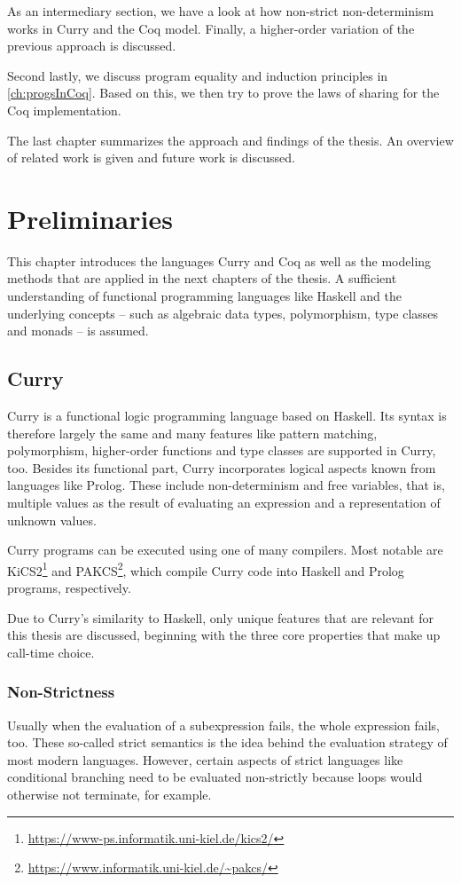 \documentclass[a4paper, 11pt, fleqn, twoside, abstract=on]{scrreprt}
\begin{document}
As an intermediary section, we have a look at how non-strict non-determinism works in Curry and the Coq model.
Finally, a higher-order variation of the previous approach is discussed.

Second lastly, we discuss program equality and induction principles in  \autoref{ch:progsInCoq}.
Based on this, we then try to prove the laws of sharing for the Coq implementation.

The last chapter summarizes the approach and findings of the thesis.
An overview of related work is given and future work is discussed.

\chapter{Preliminaries}
\label{ch:preliminaries}
This chapter introduces the languages Curry and Coq as well as the modeling methods that are applied in the next chapters of the thesis.
A sufficient understanding of functional programming languages like Haskell and the underlying concepts -- such as algebraic data types, polymorphism, type classes and monads -- is assumed.


\section{Curry}
Curry \citep{hanus2016curry} is a functional logic programming language based on Haskell.
Its syntax is therefore largely the same and many features like pattern matching, polymorphism, higher-order functions and type classes are supported in Curry, too.
Besides its functional part, Curry incorporates logical aspects known from languages like Prolog.
These include non-determinism and free variables, that is,  multiple values as the result of evaluating an expression and a representation of unknown values.

Curry programs can be executed using one of many compilers.
Most notable are KiCS2\footnote{\url{https://www-ps.informatik.uni-kiel.de/kics2/}} and PAKCS\footnote{\url{https://www.informatik.uni-kiel.de/~pakcs/}}, which compile Curry code into Haskell and Prolog programs, respectively.

Due to Curry's similarity to Haskell, only unique features that are relevant for this thesis are discussed, beginning with the three core properties that make up call-time choice.

\subsection{Non-Strictness}
Usually when the evaluation of a subexpression fails, the whole expression fails, too.
These so-called strict semantics is the idea behind the evaluation strategy of most modern languages.
However, certain aspects of strict languages like conditional branching need to be evaluated non-strictly because loops would otherwise not terminate, for example.
\end{document}
